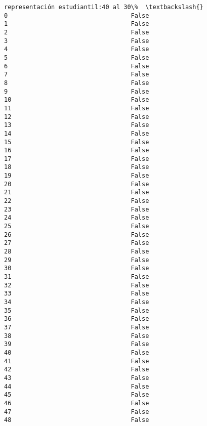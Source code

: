 \documentclass[11pt]{article}
\begin{document}
\begin{Verbatim}[commandchars=\\\{\}]
    representación estudiantil:40 al 30\%  \textbackslash{}
0                                  False   
1                                  False   
2                                  False   
3                                  False   
4                                  False   
5                                  False   
6                                  False   
7                                  False   
8                                  False   
9                                  False   
10                                 False   
11                                 False   
12                                 False   
13                                 False   
14                                 False   
15                                 False   
16                                 False   
17                                 False   
18                                 False   
19                                 False   
20                                 False   
21                                 False   
22                                 False   
23                                 False   
24                                 False   
25                                 False   
26                                 False   
27                                 False   
28                                 False   
29                                 False   
30                                 False   
31                                 False   
32                                 False   
33                                 False   
34                                 False   
35                                 False   
36                                 False   
37                                 False   
38                                 False   
39                                 False   
40                                 False   
41                                 False   
42                                 False   
43                                 False   
44                                 False   
45                                 False   
46                                 False   
47                                 False   
48                                 False   


\end{Verbatim}
\end{document}
